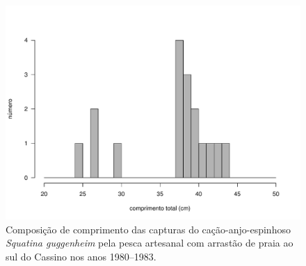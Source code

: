 \documentclass[a4paper,11pt,twoside,showtrims,onecolumn,openright,final]{memoir}
\begin{document}
%
%

\begin{figure}
\begin{center}
\includegraphics[width=\textwidth]{Guggenheim_HistogramaPraia}
\end{center}
\caption[Composição de comprimento das capturas  do cação-anjo-espinhoso \emph{Squatina guggenheim} 
	 pela pesca artesanal com arrastão de praia]
	{Composição de comprimento das capturas  do cação-anjo-espinhoso \emph{Squatina guggenheim} 
	 pela pesca artesanal com arrastão de praia ao sul do Cassino nos anos 1980--1983.}
\label{fig:guggenheim-distrib-arrasto1980}
\end{figure}


%
%
\end{document}
